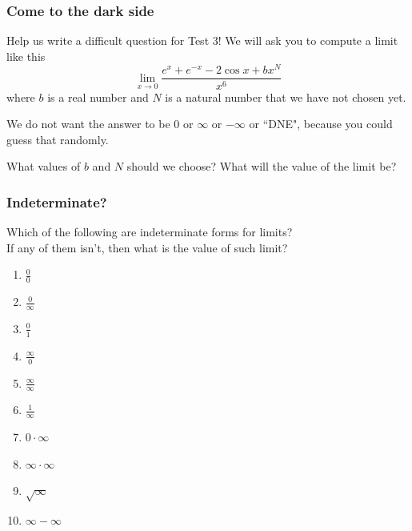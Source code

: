 \documentclass[14pt]{beamer}
\begin{document}
\begin{frame}[t]
	\fontsize{13}{13}\selectfont
	\frametitle{Come to the dark side}

	Help us write a difficult question for Test 3! We will ask you to compute a
	limit like this
	\[
		\lim_{x \to 0}\frac{e^{x}+ e^{-x}- 2 \cos x + bx^{N}}{x^{6}}
	\]
	where $b$ is a real number and $N$ is a natural number that we have not chosen
	yet.

	We do not want the answer to be $0$ or $\infty$ or $-\infty$ or ``DNE",
	because you could guess that randomly.

	What values of $b$ and $N$ should we choose? What will the value of the limit be?
\end{frame}

\begin{frame}[t]
	\frametitle{Indeterminate?}

	Which of the following are indeterminate forms for limits? \\ If any of them isn't,
	then what is the value of such limit?

	\begin{multicols}{4}
		\begin{enumerate}
			\setlength{\itemsep}{1em}

			\item $\displaystyle \frac{0}{0}$

			\item $\displaystyle \frac{0}{\infty}$

			\item $\displaystyle \frac{0}{1}$

			\item $\displaystyle \frac{\infty}{0}$

			\item $\displaystyle \frac{\infty}{\infty}$

			\item $\displaystyle \frac{1}{\infty}$

			\item $\displaystyle 0 \cdot \infty$ 

			\item $\displaystyle \infty \cdot \infty$ 

			\item $\displaystyle \sqrt{\infty}$

			\item $\displaystyle \infty - \infty$


\end{enumerate}
\end{multicols}
\end{frame}
\end{document}
